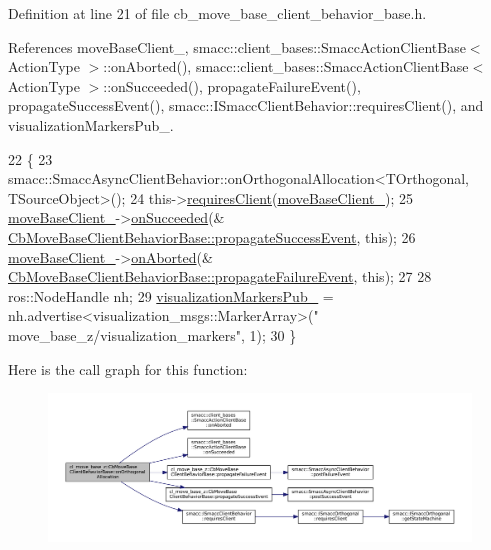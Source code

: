 Definition at line 21 of file cb\+\_\+move\+\_\+base\+\_\+client\+\_\+behavior\+\_\+base.\+h.



References move\+Base\+Client\+\_\+, smacc\+::client\+\_\+bases\+::\+Smacc\+Action\+Client\+Base$<$ Action\+Type $>$\+::on\+Aborted(), smacc\+::client\+\_\+bases\+::\+Smacc\+Action\+Client\+Base$<$ Action\+Type $>$\+::on\+Succeeded(), propagate\+Failure\+Event(), propagate\+Success\+Event(), smacc\+::\+I\+Smacc\+Client\+Behavior\+::requires\+Client(), and visualization\+Markers\+Pub\+\_\+.


\begin{DoxyCode}
22   \{
23     smacc::SmaccAsyncClientBehavior::onOrthogonalAllocation<TOrthogonal, TSourceObject>();
24     this->\hyperlink{classsmacc_1_1ISmaccClientBehavior_a32b16e99e3b4cb289414203dc861a440}{requiresClient}(\hyperlink{classcl__move__base__z_1_1CbMoveBaseClientBehaviorBase_ab2ef219464cfac8659b4a87c8d0db6d5}{moveBaseClient\_});
25     \hyperlink{classcl__move__base__z_1_1CbMoveBaseClientBehaviorBase_ab2ef219464cfac8659b4a87c8d0db6d5}{moveBaseClient\_}->\hyperlink{classsmacc_1_1client__bases_1_1SmaccActionClientBase_af6d77c27d21b2e4f621f53c5f1df088b}{onSucceeded}(&
      \hyperlink{classcl__move__base__z_1_1CbMoveBaseClientBehaviorBase_a12109fd9132a93140e4f022ee052e2ed}{CbMoveBaseClientBehaviorBase::propagateSuccessEvent}, \textcolor{keyword}{
      this});
26     \hyperlink{classcl__move__base__z_1_1CbMoveBaseClientBehaviorBase_ab2ef219464cfac8659b4a87c8d0db6d5}{moveBaseClient\_}->\hyperlink{classsmacc_1_1client__bases_1_1SmaccActionClientBase_a75c58162621a705bfd11efdf068eb06b}{onAborted}(&
      \hyperlink{classcl__move__base__z_1_1CbMoveBaseClientBehaviorBase_a8a1d14d98893dc21c4cb2b28c35e9b09}{CbMoveBaseClientBehaviorBase::propagateFailureEvent}, \textcolor{keyword}{
      this});
27 
28     ros::NodeHandle nh;
29     \hyperlink{classcl__move__base__z_1_1CbMoveBaseClientBehaviorBase_aff48fc567ae025b196efd8895b7fb35d}{visualizationMarkersPub\_} = nh.advertise<visualization\_msgs::MarkerArray>(\textcolor{stringliteral}{"
      move\_base\_z/visualization\_markers"}, 1);
30   \}
\end{DoxyCode}
Here is the call graph for this function\+:
\nopagebreak
\begin{figure}[H]
\begin{center}
\leavevmode
\includegraphics[width=350pt]{classcl__move__base__z_1_1CbMoveBaseClientBehaviorBase_ae9e4d5856a88c367edd755cdd00b377f_cgraph}
\end{center}
\end{figure}

